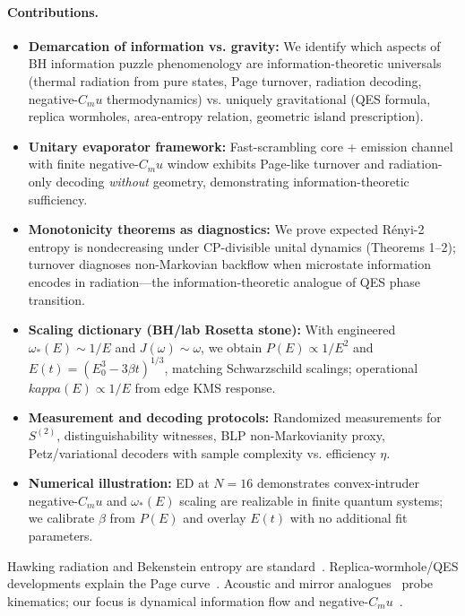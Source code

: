 \documentclass[aps,prx,onecolumn,showpacs,superscriptaddress,longbibliography,nofootinbib]{revtex4-2}
\def\kappa{kappa}%
\def\mu{mu}%
\begin{document}
\paragraph*{Contributions.}
\begin{itemize}[leftmargin=*]
\item \textbf{Demarcation of information vs. gravity:} We identify which aspects of BH information puzzle phenomenology are information-theoretic universals (thermal radiation from pure states, Page turnover, radiation decoding, negative-$C_\mu$ thermodynamics) vs. uniquely gravitational (QES formula, replica wormholes, area-entropy relation, geometric island prescription).
\item \textbf{Unitary evaporator framework:} Fast-scrambling core + emission channel with finite negative-$C_\mu$ window exhibits Page-like turnover and radiation-only decoding \emph{without} geometry, demonstrating information-theoretic sufficiency.
\item \textbf{Monotonicity theorems as diagnostics:} We prove expected R\'enyi-2 entropy is nondecreasing under CP-divisible unital dynamics (Theorems 1--2); turnover diagnoses non-Markovian backflow when microstate information encodes in radiation---the information-theoretic analogue of QES phase transition.
\item \textbf{Scaling dictionary (BH/lab Rosetta stone):} With engineered $\omega_\ast(E) \sim 1/E$ and $J(\omega) \sim \omega$, we obtain $P(E) \propto 1/E^2$ and $E(t)=(E_0^3-3\beta t)^{1/3}$, matching Schwarzschild scalings; operational $\kappa(E) \propto 1/E$ from edge KMS response.
\item \textbf{Measurement and decoding protocols:} Randomized measurements for $S^{(2)}$, distinguishability witnesses, BLP non-Markovianity proxy, Petz/variational decoders with sample complexity vs. efficiency $\eta$.
\item \textbf{Numerical illustration:} ED at $N{=}16$ demonstrates convex-intruder negative-$C_\mu$ and $\omega_\ast(E)$ scaling are realizable in finite quantum systems; we calibrate $\beta$ from $P(E)$ and overlay $E(t)$ with no additional fit parameters.
\end{itemize}

Hawking radiation and Bekenstein entropy are standard~\cite{Hawking1975,Bekenstein1973}. Replica-wormhole/QES developments explain the Page curve~\cite{EngelhardtWall2015,AEMM2019,Penington2019,AlmheiriRMP2021}. Acoustic and mirror analogues~\cite{Unruh1981,Steinhauer2016,FullingDavies1976,Wilson2011DCE} probe kinematics; our focus is dynamical information flow and negative-$C_\mu$~\cite{GrossBook2001,Schmidt2001Na147,DAgostino2000}.
\end{document}
